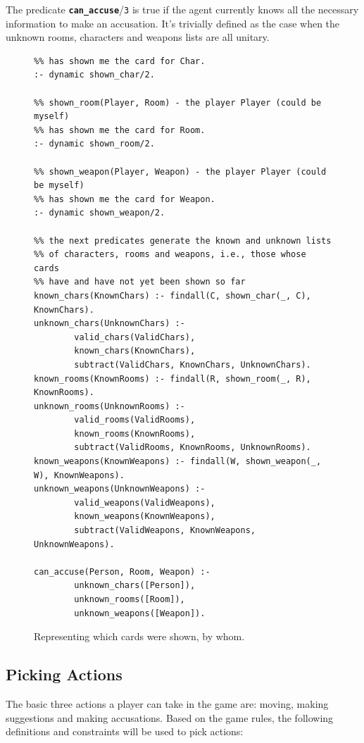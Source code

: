 \documentclass[12pt,a4paper]{article}
\newcommand{\varname}[1]{\texttt{#1}}
\newcommand{\varnamebf}[1]{\textbf{\texttt{#1}}}
\newcommand{\predprot}[2]{{\color{MidnightBlue}\varnamebf{#1}}/{\color{Mulberry}\varname{#2}}}
\begin{document}
The predicate \predprot{can\_accuse}{3} is true if the agent currently knows all the necessary information to make an accusation. It's trivially defined as the case when the unknown rooms, characters and weapons lists are all unitary.

\begin{figure}[H]
	\centering
\begin{lstlisting}[style=Prolog-pygsty]
%% shown_char(Player, Char) - the player Player (could be myself)
%% has shown me the card for Char.
:- dynamic shown_char/2.

%% shown_room(Player, Room) - the player Player (could be myself)
%% has shown me the card for Room.
:- dynamic shown_room/2.

%% shown_weapon(Player, Weapon) - the player Player (could be myself)
%% has shown me the card for Weapon.
:- dynamic shown_weapon/2.

%% the next predicates generate the known and unknown lists
%% of characters, rooms and weapons, i.e., those whose cards
%% have and have not yet been shown so far
known_chars(KnownChars) :- findall(C, shown_char(_, C), KnownChars).
unknown_chars(UnknownChars) :-
		valid_chars(ValidChars),
		known_chars(KnownChars),
		subtract(ValidChars, KnownChars, UnknownChars).
known_rooms(KnownRooms) :- findall(R, shown_room(_, R), KnownRooms).
unknown_rooms(UnknownRooms) :-
		valid_rooms(ValidRooms),
		known_rooms(KnownRooms),
		subtract(ValidRooms, KnownRooms, UnknownRooms).
known_weapons(KnownWeapons) :- findall(W, shown_weapon(_, W), KnownWeapons).		
unknown_weapons(UnknownWeapons) :-
		valid_weapons(ValidWeapons),
		known_weapons(KnownWeapons),
		subtract(ValidWeapons, KnownWeapons, UnknownWeapons).

can_accuse(Person, Room, Weapon) :-
		unknown_chars([Person]),
		unknown_rooms([Room]),
		unknown_weapons([Weapon]).
\end{lstlisting}
	\caption{Representing which cards were shown, by whom.} 
	\label{fig:shown-cards}
\end{figure}

\subsection{Picking Actions}
\label{sec:actions}

The basic three actions a player can take in the game are: moving, making suggestions and making accusations. Based on the game rules, the following definitions and constraints will be used to pick actions:
\end{document}
